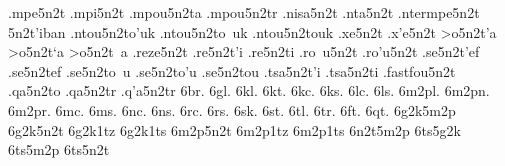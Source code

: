 {.mpe5n2t     %
.mpi5n2t     %
.mpou5n2ta   %
.mpou5n2tr   %
.nisa5n2t    %
.nta5n2t     %
.ntermpe5n2t %
5n2t'iban    %
.ntou5n2to'uk %
.ntou5n2to~uk
.ntou5n2touk
.xe5n2t      %
.x'e5n2t
>o5n2t'a     %
>o5n2t`a
>o5n2t~a
.reze5n2t    %
.re5n2t'i    %
.re5n2ti 
.ro~u5n2t    %
.ro'u5n2t
.se5n2t'ef   %
.se5n2tef
.se5n2to~u   %
.se5n2to'u
.se5n2tou
.tsa5n2t'i   %
.tsa5n2ti
.fastfou5n2t %
.qa5n2to     %
.qa5n2tr     %
.q'a5n2tr
6br.   %
6gl.   %
6kl.   %
6kt.   %
6kc.   %
6ks.
6lc.   %
6ls.
6m2pl. %
6m2pn. %
6m2pr. %
6mc.   %
6ms.
6nc.   %
6ns.
6rc.   %
6rs.
6sk.   %
6st.   %
6tl.   %
6tr.   %
6ft.   %
6qt.   %
6g2k5m2p
6g2k5n2t
6g2k1tz
6g2k1ts
6m2p5n2t
6m2p1tz
6m2p1ts
6n2t5m2p
6ts5g2k
6ts5m2p
6ts5n2t
} %
\endgroup
\endinput
